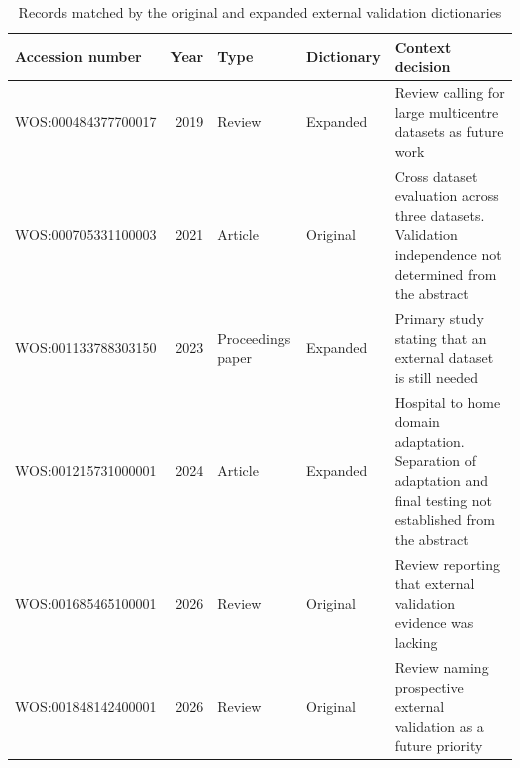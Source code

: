 \begin{table}[!ht]
\caption{Records matched by the original and expanded external validation dictionaries}
\centering
\footnotesize
\begin{tabularx}{\textwidth}{@{}L{3.6cm}rlL{2.4cm}Y@{}}
\toprule
Accession number & Year & Type & Dictionary & Context decision \\
\midrule
WOS:000484377700017 & 2019 & Review & Expanded & Review calling for large multicentre datasets as future work \\
WOS:000705331100003 & 2021 & Article & Original & Cross dataset evaluation across three datasets. Validation independence not determined from the abstract \\
WOS:001133788303150 & 2023 & Proceedings paper & Expanded & Primary study stating that an external dataset is still needed \\
WOS:001215731000001 & 2024 & Article & Expanded & Hospital to home domain adaptation. Separation of adaptation and final testing not established from the abstract \\
WOS:001685465100001 & 2026 & Review & Original & Review reporting that external validation evidence was lacking \\
WOS:001848142400001 & 2026 & Review & Original & Review naming prospective external validation as a future priority \\
\bottomrule
\end{tabularx}
\end{table}
